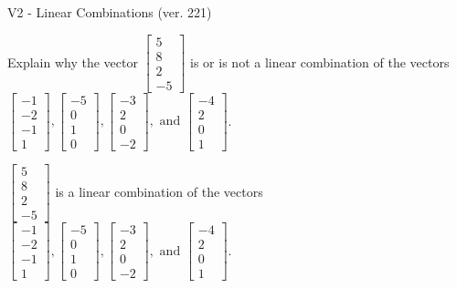 \begin{exercise}
  \begin{exerciseTitle}V2 - Linear Combinations (ver. 221)\end{exerciseTitle}
  \begin{exerciseStatement}
    Explain why the vector \(\left[\begin{array}{c}
5 \\
8 \\
2 \\
-5
\end{array}\right]\)  is or is not a linear 
	combination of the vectors \(\left[\begin{array}{c}
-1 \\
-2 \\
-1 \\
1
\end{array}\right] , \left[\begin{array}{c}
-5 \\
0 \\
1 \\
0
\end{array}\right] , \left[\begin{array}{c}
-3 \\
2 \\
0 \\
-2
\end{array}\right] , \text{ and } \left[\begin{array}{c}
-4 \\
2 \\
0 \\
1
\end{array}\right]\).
	


  \end{exerciseStatement}
  \begin{exerciseAnswer}
   \(\left[\begin{array}{c}
5 \\
8 \\
2 \\
-5
\end{array}\right]\) 
  	 is  
	a linear combination of the vectors \(\left[\begin{array}{c}
-1 \\
-2 \\
-1 \\
1
\end{array}\right] , \left[\begin{array}{c}
-5 \\
0 \\
1 \\
0
\end{array}\right] , \left[\begin{array}{c}
-3 \\
2 \\
0 \\
-2
\end{array}\right] , \text{ and } \left[\begin{array}{c}
-4 \\
2 \\
0 \\
1
\end{array}\right]\).


\end{exerciseAnswer}
\end{exercise}
